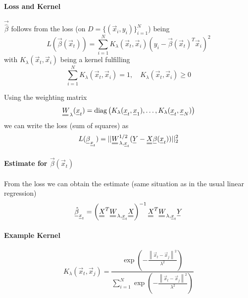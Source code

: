 \paragraph*{Loss and Kernel}
$\vec{\hat{\beta}}$ follows from the loss (on $D = \{(\vec{x}_i,y_i)\}_{i=1}^N$) being
\begin{equation}
    L(\vec{\beta}(\vec{x}_t)) = \sum_{i=1}^N K_\lambda(\vec{x}_t,\vec{x}_i) (y_i - \vec{\beta}(\vec{x}_t)^T \vec{x}_i)^2
\end{equation}
with $K_\lambda(\vec{x}_t,\vec{x}_i)$ being a kernel fulfilling
\begin{equation}
    \sum_{i=1}^N K_\lambda(\vec{x}_t,\vec{x}_i) = 1, \quad K_\lambda(\vec{x}_t,\vec{x}_i) \geq 0
\end{equation}

Using the weighting matrix
\begin{equation}
    \mat{W}_\lambda(\vec{x}_t) = \operatorname{diag}\left(K_\lambda(\vec{x}_t,\vec{x}_1), \dots, K_\lambda(\vec{x}_t,\vec{x}_N)\right)
\end{equation}
we can write the loss (sum of squares) as
\begin{equation}
    L(\vec{\beta}_{\vec{x}_t}) = ||\mat{W}_{\lambda, \vec{x}_t}^{1/2} (\vec{Y} - \mat{X} \vec{\beta}(\vec{x}_t))||_2^2
\end{equation}

\paragraph*{Estimate for $\vec{\beta}(\vec{x}_t)$}
From the loss we can obtain the estimate (same situation as in the usual linear regression)
\begin{equation}
    \vec{\hat{\beta}}_{\vec{x}_t} = \left( \mat{X}^T \mat{W}_{\lambda, \vec{x}_t} \mat{X} \right)^{-1} \mat{X}^T \mat{W}_{\lambda, \vec{x}_t} \vec{Y}
\end{equation}

\paragraph*{Example Kernel}
\begin{equation}
    K_\lambda\left(\vec{x}_t, \vec{x}_j\right)=\frac{\exp \left(-\frac{\left\|\vec{x}_t-\vec{x}_j\right\|^2}{\lambda^2}\right)}{\sum_{i=1}^N \exp \left(-\frac{\left\|\vec{x}_t-\vec{x}_j\right\|^2}{\lambda^2}\right)}
\end{equation}

